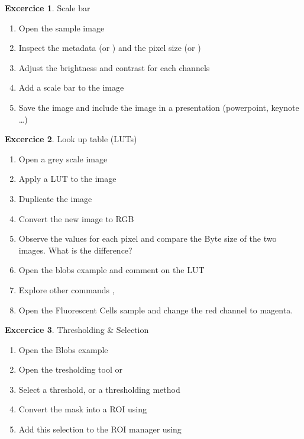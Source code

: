 \documentclass[xcolor=table,DIV=19,twocolumn]{scrartcl}
\theoremstyle{definition}
\newtheorem{exercice}{Excercice}
\begin{document}
\begin{exercice} Scale bar
  \begin{enumerate}
  \item Open the sample image  
  \item Inspect the metadata  (or ) and the pixel size  (or )
  \item Adjust the brightness and contrast for each channels
  \item Add a scale bar to the image
  \item Save the image and include the image in a presentation (powerpoint, keynote \dots)
  \end{enumerate}
\end{exercice}


\begin{exercice} Look up table (LUTs)
  \begin{enumerate}
  \item Open a grey scale image 
  \item Apply a LUT to the image 
  \item Duplicate the image 
  \item Convert the new image to RGB 
  \item Observe the values for each pixel and compare the Byte size of the two images. What is the difference?
  \item Open the blobs example  and
    comment on the LUT
  \item Explore other commands ,
  \item Open the Fluorescent Cells sample and change the red channel
    to magenta.
  \end{enumerate}
\end{exercice}

\begin{exercice} Thresholding \& Selection
  \begin{enumerate}
  \item Open the Blobs example 
  \item Open the tresholding tool  or 
  \item Select a threshold, or a thresholding method
  \item Convert the mask into a ROI using 
  \item Add this selection to the ROI manager using 
  \end{enumerate}
\end{exercice}
\end{document}
